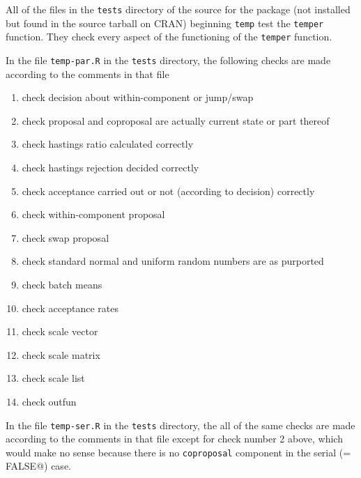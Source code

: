 \documentclass{article}
\begin{document}
All of the files in the \texttt{tests} directory of the source for the
package (not installed but found in the source tarball on CRAN)
beginning \texttt{temp} test the \texttt{temper} function.
They check every aspect of the functioning of the \texttt{temper} function.

In the file \texttt{temp-par.R} in the \texttt{tests} directory, the following
checks are made according to the comments in that file
\begin{enumerate}
\item check decision about within-component or jump/swap
\item check proposal and coproposal are actually current state or part thereof
\item check hastings ratio calculated correctly
\item check hastings rejection decided correctly
\item check acceptance carried out or not (according to decision) correctly
\item check within-component proposal
\item check swap proposal
\item check standard normal and uniform random numbers are as purported
\item check batch means
\item check acceptance rates
\item check scale vector
\item check scale matrix
\item check scale list
\item check outfun
\end{enumerate}
In the file \texttt{temp-ser.R} in the \texttt{tests} directory, the all of
the same checks are made according to the comments in that file except for
check number 2 above, which would make no sense because there is no
\texttt{coproposal} component in the serial (\verb@parallel = FALSE@) case.
\end{document}
